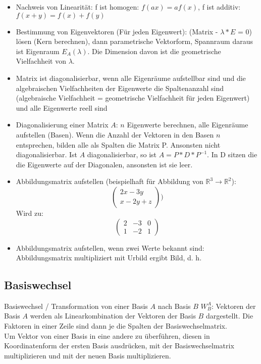 \documentclass[12pt,landscape]{article}
\begin{document}
\begin{multicols}{3}
\begin{itemize}
\item Nachweis von Linearität: f ist homogen: $f(ax) = af(x)$, f ist additiv: $f(x + y) = f(x) + f(y)$
\item Bestimmung von Eigenvektoren (Für jeden Eigenwert): (Matrix - $\lambda  * E$ = 0) lösen (Kern berechnen), dann parametrische Vektorform, Spannraum daraus ist Eigenraum $E_A(\lambda)$. Die Dimension davon ist die geometrische Vielfachheit von $\lambda$. 
\item Matrix ist diagonalisierbar, wenn alle Eigenräume aufstellbar sind und die algebraischen Vielfachheiten der Eigenwerte die Spaltenanzahl sind (algebraische Vielfachheit = geometrische Vielfachheit für jeden Eigenwert) und alle Eigenwerte reell sind
\item Diagonalisierung einer Matrix $A$: $n$ Eigenwerte berechnen, alle Eigenräume aufstellen (Basen). Wenn die Anzahl der Vektoren in den Basen $n$ entsprechen, bilden alle als Spalten die Matrix P. Ansonsten nicht diagonalisierbar. Ist $A$ diagonalisierbar, so ist $A = P * D * P^{-1}$. In D sitzen die die Eigenwerte auf der Diagonalen, ansonsten ist sie leer.
\item Abbildungsmatrix aufstellen (beispielhaft für Abbildung von $\mathbb{R}^3 \rightarrow \mathbb{R}^2$):
\[\begin{pmatrix}
2x - 3y \\ x - 2y + z
\end{pmatrix})
\]
Wird zu:
\[\begin{pmatrix}
2 & -3 & 0 \\
1 & -2 & 1
\end{pmatrix}
\]
\item Abbildungsmatrix aufstellen, wenn zwei Werte bekannt sind: Abbildungsmatrix multipliziert mit Urbild ergibt Bild, d. h. 
\end{itemize}
\subsection{Basiswechsel}
Basiswechsel / Transformation von einer Basis $A$ nach Basis $B$ $W^A_B$: Vektoren der Basis $A$ werden als Linearkombination der Vektoren der Basis $B$ dargestellt. Die Faktoren in einer Zeile sind dann je die Spalten der Basiswechselmatrix.\\
Um Vektor von einer Basis in eine andere zu überführen, diesen in Koordinatenform der ersten Basis ausdrücken, mit der Basiswechselmatrix multiplizieren und mit der neuen Basis multiplizieren.

\end{multicols}
\end{document}
